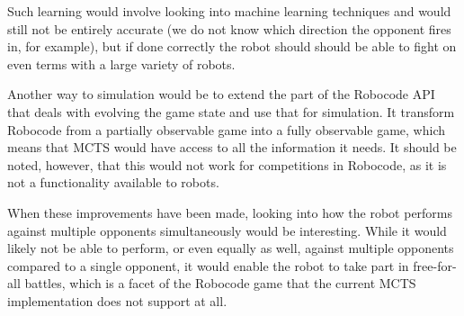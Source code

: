 Such learning would involve looking into machine learning techniques and would still not be entirely accurate (we do not know which direction the opponent fires in, for example), but if done correctly the robot should should be able to fight on even terms with a large variety of robots.

Another way to simulation would be to extend the part of the Robocode API that deals with evolving the game state and use that for simulation. It transform Robocode from a partially observable game into a fully observable game, which means that MCTS would have access to all the information it needs. It should be noted, however, that this would not work for competitions in Robocode, as it is not a functionality available to robots.

When these improvements have been made, looking into how the robot performs against multiple opponents simultaneously would be interesting. While it would likely not be able to perform, or even equally as well, against multiple opponents compared to a single opponent, it would enable the robot to take part in free-for-all battles, which is a facet of the Robocode game that the current MCTS implementation does not support at all.

